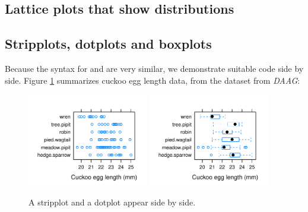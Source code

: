 \subsection{Lattice plots that show distributions}\label{sec:dists}

\subsection*{Stripplots, dotplots and boxplots}\label{ss:stripetc}

Because the syntax for  and  are
very similar, we demonstrate suitable code side by side.  Figure
\ref{fig:strip-bw} summarizes cuckoo egg length data, from the
dataset  from \textit{DAAG}:
\vspace*{-9pt}

\begin{figure}
\begin{Schunk}


\centerline{\includegraphics[width=0.47\textwidth]{figs/07-strip-bw-1} \includegraphics[width=0.47\textwidth]{figs/07-strip-bw-2} }

\end{Schunk}
\caption{A stripplot and a dotplot appear side by side.\label{fig:strip-bw}}
\end{figure}

